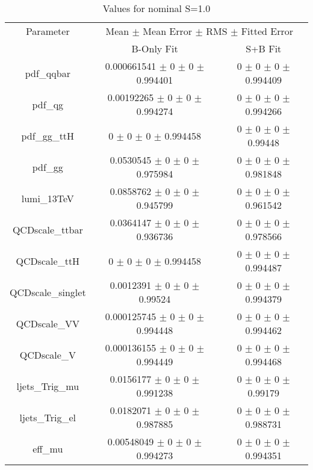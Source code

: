 \begin{table}
\centering
\caption{Values for nominal S=1.0}
\begin{tabular}{ccc}
\toprule
Parameter & \multicolumn{2}{c}{Mean $\pm$ Mean Error $\pm$ RMS $\pm$ Fitted Error}\\
 & B-Only Fit & S+B Fit\\
\midrule
pdf\_qqbar & \num{0.000661541} $\pm$ \num{0} $\pm$ \num{0} $\pm$ \num{0.994401} & \num{0} $\pm$ \num{0} $\pm$ \num{0} $\pm$ \num{0.994409}\\
pdf\_qg & \num{0.00192265} $\pm$ \num{0} $\pm$ \num{0} $\pm$ \num{0.994274} & \num{0} $\pm$ \num{0} $\pm$ \num{0} $\pm$ \num{0.994266}\\
pdf\_gg\_ttH & \num{0} $\pm$ \num{0} $\pm$ \num{0} $\pm$ \num{0.994458} & \num{0} $\pm$ \num{0} $\pm$ \num{0} $\pm$ \num{0.99448}\\
pdf\_gg & \num{0.0530545} $\pm$ \num{0} $\pm$ \num{0} $\pm$ \num{0.975984} & \num{0} $\pm$ \num{0} $\pm$ \num{0} $\pm$ \num{0.981848}\\
lumi\_13TeV & \num{0.0858762} $\pm$ \num{0} $\pm$ \num{0} $\pm$ \num{0.945799} & \num{0} $\pm$ \num{0} $\pm$ \num{0} $\pm$ \num{0.961542}\\
QCDscale\_ttbar & \num{0.0364147} $\pm$ \num{0} $\pm$ \num{0} $\pm$ \num{0.936736} & \num{0} $\pm$ \num{0} $\pm$ \num{0} $\pm$ \num{0.978566}\\
QCDscale\_ttH & \num{0} $\pm$ \num{0} $\pm$ \num{0} $\pm$ \num{0.994458} & \num{0} $\pm$ \num{0} $\pm$ \num{0} $\pm$ \num{0.994487}\\
QCDscale\_singlet & \num{0.0012391} $\pm$ \num{0} $\pm$ \num{0} $\pm$ \num{0.99524} & \num{0} $\pm$ \num{0} $\pm$ \num{0} $\pm$ \num{0.994379}\\
QCDscale\_VV & \num{0.000125745} $\pm$ \num{0} $\pm$ \num{0} $\pm$ \num{0.994448} & \num{0} $\pm$ \num{0} $\pm$ \num{0} $\pm$ \num{0.994462}\\
QCDscale\_V & \num{0.000136155} $\pm$ \num{0} $\pm$ \num{0} $\pm$ \num{0.994449} & \num{0} $\pm$ \num{0} $\pm$ \num{0} $\pm$ \num{0.994468}\\
ljets\_Trig\_mu & \num{0.0156177} $\pm$ \num{0} $\pm$ \num{0} $\pm$ \num{0.991238} & \num{0} $\pm$ \num{0} $\pm$ \num{0} $\pm$ \num{0.99179}\\
ljets\_Trig\_el & \num{0.0182071} $\pm$ \num{0} $\pm$ \num{0} $\pm$ \num{0.987885} & \num{0} $\pm$ \num{0} $\pm$ \num{0} $\pm$ \num{0.988731}\\
eff\_mu & \num{0.00548049} $\pm$ \num{0} $\pm$ \num{0} $\pm$ \num{0.994273} & \num{0} $\pm$ \num{0} $\pm$ \num{0} $\pm$ \num{0.994351}\\

\end{tabular}
\end{table}
